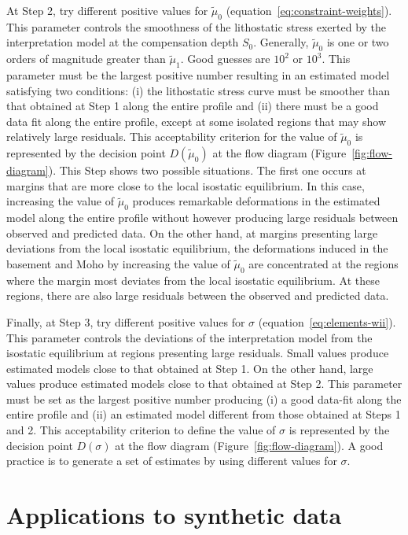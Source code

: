 \documentclass[manuscript,revised]{geophysics}
\begin{document}
At Step 2, try different positive values for $\tilde{\mu}_{0}$ 
(equation~\ref{eq:constraint-weights}). This parameter
controls the smoothness of the lithostatic stress exerted by the interpretation model
at the compensation depth $S_{0}$. Generally, $\tilde{\mu}_{0}$ is one or two 
orders of magnitude greater than $\tilde{\mu}_{1}$. 
Good guesses are $10^{2}$ or $10^{3}$.
This parameter must be the largest positive number resulting in an estimated
model satisfying two conditions: 
(i) the lithostatic stress curve must be smoother than that obtained at Step 1 
along the entire profile and 
(ii) there must be a good data fit along the entire
profile, except at some isolated regions that may show relatively large residuals.
This acceptability criterion for the value of $\tilde{\mu}_{0}$ is
represented by the decision point $D(\tilde{\mu}_{0})$ 
at the flow diagram (Figure~\ref{fig:flow-diagram}).
This Step shows two possible situations. The first one occurs at margins that are
more close to the local isostatic equilibrium. In this case, increasing the value of
$\tilde{\mu}_{0}$ produces remarkable deformations in the estimated model along the
entire profile without however producing large residuals between observed and predicted data.
On the other hand, at margins presenting large deviations from the local isostatic
equilibrium, the deformations induced in the basement and Moho by increasing the value of
$\tilde{\mu}_{0}$ are concentrated at the regions where the margin most deviates from 
the local isostatic equilibrium. At these regions, there are also large residuals between
the observed and predicted data.

Finally, at Step 3, try different positive values for $\sigma$ (equation~\ref{eq:elements-wii}).
This parameter controls the deviations of the interpretation model from the
isostatic equilibrium at regions presenting large residuals.
Small values produce estimated models close to that obtained at Step 1.
On the other hand, large values produce estimated models close to that
obtained at Step 2.
This parameter must be set as the largest positive number producing (i) a good data-fit
along the entire profile and (ii) an estimated model different from those obtained
at Steps 1 and 2.
This acceptability criterion to define the value of $\sigma$ is
represented by the decision point $D(\sigma)$ 
at the flow diagram (Figure~\ref{fig:flow-diagram}).
A good practice is to generate a set of estimates by using different 
values for $\sigma$. 


\section{Applications to synthetic data}
\end{document}
